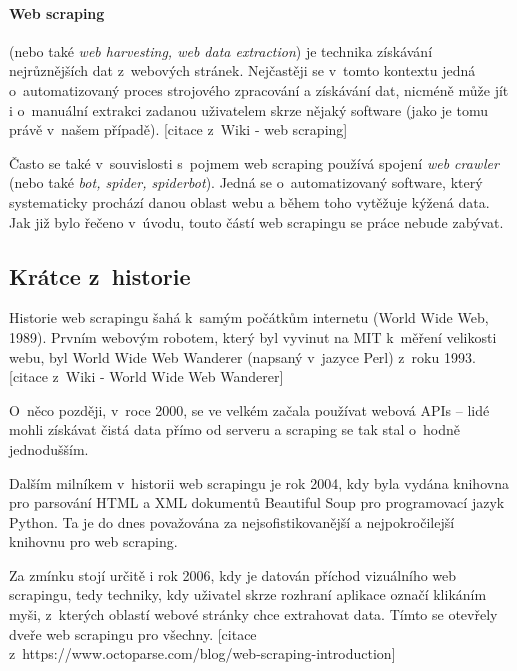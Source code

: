 \documentclass[thesis=B,czech]{FITthesis}[2012/06/26]
\begin{document}
\paragraph{Web scraping}
(nebo také \textit{web harvesting, web data extraction}) je technika získávání nejrůznějších dat z~webových stránek. Nejčastěji se v~tomto kontextu jedná o~automatizovaný proces strojového zpracování a získávání dat, nicméně může jít i o~manuální extrakci zadanou uživatelem skrze nějaký software (jako je tomu právě v~našem případě). [citace z~Wiki - web scraping]

Často se také v~souvislosti s~pojmem web scraping používá spojení \textit{web crawler} (nebo také \textit{bot, spider, spiderbot}). Jedná se o~automatizovaný software, který systematicky prochází danou oblast webu a během toho vytěžuje kýžená data. Jak již bylo řečeno v~úvodu, touto částí web scrapingu se práce nebude zabývat.

\subsection{Krátce z~historie}
Historie web scrapingu šahá k~samým počátkům internetu (World Wide Web, 1989). Prvním webovým robotem, který byl vyvinut na MIT k~měření velikosti webu, byl World Wide Web Wanderer (napsaný v~jazyce Perl) z~roku 1993. [citace z~Wiki - World Wide Web Wanderer] 

O~něco později, v~roce 2000, se ve velkém začala používat webová APIs -- lidé mohli získávat čistá data přímo od serveru a scraping se tak stal o~hodně jednodušším. 

Dalším milníkem v~historii web scrapingu je rok 2004, kdy byla vydána knihovna pro parsování HTML a XML dokumentů Beautiful Soup pro programovací jazyk Python. Ta je do dnes považována za nejsofistikovanější a nejpokročilejší knihovnu pro web scraping.

Za zmínku stojí určitě i rok 2006, kdy je datován příchod vizuálního web scrapingu, tedy techniky, kdy uživatel skrze rozhraní  aplikace označí klikáním myši, z~kterých oblastí webové stránky chce extrahovat data. Tímto se otevřely dveře web scrapingu pro všechny. [citace z~https://www.octoparse.com/blog/web-scraping-introduction]
\end{document}
